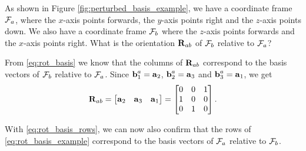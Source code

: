 \begin{example}[frametitle=Rotation matrix from basis vector perturbations]
{
  \centering
  
  \captionsetup{type=figure}
  \label{fig:perturbed_basis_example}
  \par
}

As shown in Figure \ref{fig:perturbed_basis_example}, we have a coordinate frame $\mathcal{F}_a$, where the $x$-axis points forwards, the $y$-axis points right and the $z$-axis points down.
We also have a coordinate frame $\mathcal{F}_b$ where the $z$-axis points forwards and the $x$-axis points right.
What is the orientation ${\boldsymbol{\mathbf{R}}}_{ab}$ of $\mathcal{F}_b$ relative to $\mathcal{F}_a$?

From \eqref{eq:rot_basis} we know that the columns of ${\boldsymbol{\mathbf{R}}}_{ab}$ correspond to the basis vectors of $\mathcal{F}_b$ relative to $\mathcal{F}_a$.
Since ${\boldsymbol{\mathbf{b}}}^a_1 = {\boldsymbol{\mathbf{a}}}_2$, ${\boldsymbol{\mathbf{b}}}^a_2 = {\boldsymbol{\mathbf{a}}}_3$ and ${\boldsymbol{\mathbf{b}}}^a_3 = {\boldsymbol{\mathbf{a}}}_1$, we get
\begin{equation} \label{eq:rot_basis_example}
  {\boldsymbol{\mathbf{R}}}_{ab} = 
  \begin{bmatrix}
    {\boldsymbol{\mathbf{a}}}_2 & {\boldsymbol{\mathbf{a}}}_3 & {\boldsymbol{\mathbf{a}}}_1
  \end{bmatrix}
  =
  \begin{bmatrix}
    0 & 0 & 1\\
    1 & 0 & 0\\
    0 & 1 & 0
  \end{bmatrix}.
\end{equation}

With \eqref{eq:rot_basis_rows}, we can now also confirm that the rows of \eqref{eq:rot_basis_example} correspond to the basis vectors of $\mathcal{F}_a$ relative to $\mathcal{F}_b$.
\end{example}

